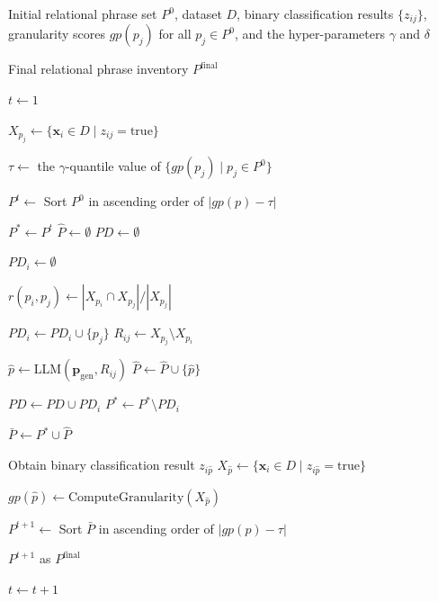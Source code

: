 \begin{algorithm}[!t] 
\caption{Intersection-based Integration}
\label{alg:integration_cycle}
\scriptsize
\begin{algorithmic}[1]
\Require Initial relational phrase set $P^0$, dataset $D$, binary classification results $\{z_{ij}\}$, granularity scores $gp(p_j)$ for all $p_j \in P^0$, and the hyper-parameters $\gamma$ and $\delta$

\Ensure Final relational phrase inventory $P^{\text{final}}$

\State $t \gets 1$

    \State $X_{p_j} \gets \{ {\mathbf x}_i \in D \mid z_{ij}=\mathrm{true} \}$
\EndFor

\State $\tau \gets$ the $\gamma$-quantile value of $\{gp(p_j) \mid p_j \in P^0\}$

\State $P^t \gets$ Sort $P^0$ in ascending order of $|gp(p)-\tau|$

    \State $P^{*} \gets P^{t}$
    \State $\hat{P} \gets \emptyset$
    \State $PD \gets \emptyset$
    
            \State $PD_i \gets \emptyset$
    
                \State $r(p_i,p_j) \gets |X_{p_i} \cap X_{p_j}| / |X_{p_j}|$
    
                    \State $PD_i \gets PD_i \cup \{p_j\}$
                    \State $R_{ij} \gets X_{p_j} \setminus X_{p_i}$
    
                        \State $\hat{p} \gets \mathrm{LLM}({\mathbf p}_{\mathrm{gen}}, R_{ij})$
                        \State $\hat{P} \gets \hat{P} \cup \{\hat{p}\}$
                    \EndIf
                \EndIf
            \EndFor
    
            \State $PD \gets PD \cup PD_i$
            \State $P^* \gets P^* \setminus PD_i$
        \EndIf
    \EndFor

    \State $\bar{P} \gets P^{*} \cup \hat{P}$

            \State Obtain binary classification result $z_{i\hat{p}}$
        \EndFor
        \State $X_{\hat{p}} \gets \{ {\mathbf x}_i \in D \mid z_{i\hat{p}}=\mathrm{true} \}$

        \State $gp(\hat{p}) \gets \mathrm{ComputeGranularity}(X_{\hat{p}})$
    \EndFor

    \State $P^{t+1} \gets$ Sort $\bar{P}$ in ascending order of $|gp(p)-\tau|$

        \State \Return $P^{t+1}$ as $P^{\text{final}}$
    \EndIf

    \State $t \gets t + 1$
\EndWhile

\end{algorithmic}
\end{algorithm}
